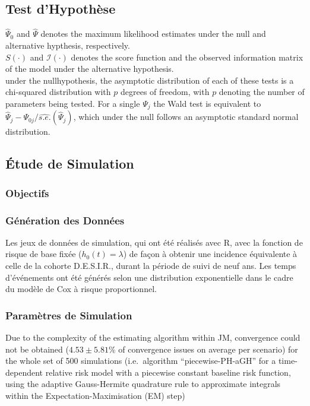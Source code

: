 \documentclass[11pt]{article} %
\begin{document}
\subsection{Test d'Hypothèse}
\par{
$\hat{\Psi}_0$ and $\hat{\Psi}$ denotes the maximum likelihood estimates under the null and alternative hypthesis, respectively.\\

$S(\cdot)$ and $\mathcal{I}(\cdot)$ denotes the score function and the observed information matrix of the model under the alternative hypothesis.\\

under the nullhypothesis, the asymptotic distribution of each of these tests is a chi-squared distribution with $p$ degrees of freedom, with $p$ denoting the number of parameters being tested.
For a single $\Psi_j$ the Wald test is equivalent to $\hat{\Psi}_j-\Psi_{0j}/\hat{s.e.}(\hat{\Psi}_j)$, which under the null follows an asymptotic standard normal distribution.
}

\subsection{\'Etude de Simulation}
\subsubsection{Objectifs}
\par{}

\subsubsection{Génération des Données}
\par{
Les jeux de données de simulation, qui ont été réalisés avec R, avec la fonction de risque de base fixée ($h_0(t)=\lambda$) de façon à obtenir une incidence équivalente à celle de la cohorte D.E.S.I.R., durant la période de suivi de neuf ans.
Les temps d'événements ont été générés selon une distribution exponentielle dans le cadre du modèle de Cox à risque proportionnel.
}

\subsubsection{Paramètres de Simulation}
\par{}

\par{Due to the complexity of the estimating algorithm within JM, convergence could not be obtained ($4.53\pm 5.81\%$ of convergence issues on average per scenario) for the whole set of 500 simulations (i.e.~algorithm ``piecewise-PH-aGH'' for a time-dependent relative risk model with a piecewise constant baseline risk function, using the adaptive Gauss-Hermite quadrature rule to approximate integrals within the Expectation-Maximisation (EM) step)}
\end{document}
